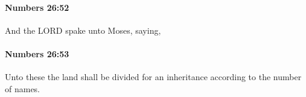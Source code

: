		\paragraph{Numbers 26:52} %
			\label{NUMBERS-26-52}

			And the LORD spake unto Moses, saying,


		\paragraph{Numbers 26:53} %
			\label{NUMBERS-26-53}

			Unto these the land shall be divided for an inheritance according to the number of names.


